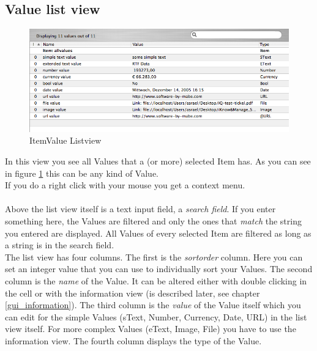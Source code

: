 \documentclass[12pt,a4]{article}
\begin{document}
\subsection{Value list view}
\label{gui_itemvaluelistview}
\medskip
% 
\begin{figure}[ht]
\begin{center}
\includegraphics[width=13.5cm]{images/ItemValueListView.png}
\end{center}
\caption{ItemValue Listview}
\label{image:itemvaluelistview}
\end{figure}
\noindent
%
In this view you see all Values that a (or more) selected Item has. As you can see in figure \ref{image:itemvaluelistview} this can be any kind of Value. \\
If you do a right click with your mouse you get a context menu. \\
\\
Above the list view itself is a text input field, a \textit{search field}. If you enter something here, the Values are filtered and only the ones that \textit{match} the string you entered are displayed. All Values of every selected Item are filtered as long as a string is in the search field. \\
The list view has four columns. The first is the \textit{sortorder} column. Here you can set an integer value that you can use to individually sort your Values. The second column is the \textit{name} of the Value. It can be altered either with double clicking in the cell or with the information view (is described later, see chapter \ref{gui_information}). The third column is the \textit{value} of the Value itself which you can edit for the simple Values (sText, Number, Currency, Date, URL) in the list view itself. For more complex Values (eText, Image, File) you have to use the information view. The fourth column displays the type of the Value.
\end{document}
